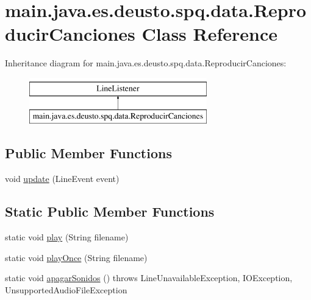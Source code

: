 \hypertarget{classmain_1_1java_1_1es_1_1deusto_1_1spq_1_1data_1_1_reproducir_canciones}{}\section{main.\+java.\+es.\+deusto.\+spq.\+data.\+Reproducir\+Canciones Class Reference}
\label{classmain_1_1java_1_1es_1_1deusto_1_1spq_1_1data_1_1_reproducir_canciones}
Inheritance diagram for main.\+java.\+es.\+deusto.\+spq.\+data.\+Reproducir\+Canciones\+:\begin{figure}[H]
\begin{center}
\leavevmode
\includegraphics[height=2.000000cm]{classmain_1_1java_1_1es_1_1deusto_1_1spq_1_1data_1_1_reproducir_canciones}
\end{center}
\end{figure}
\subsection*{Public Member Functions}
\begin{DoxyCompactItemize}
\item 
void \hyperlink{classmain_1_1java_1_1es_1_1deusto_1_1spq_1_1data_1_1_reproducir_canciones_a46c7246e92c3dc722ae252edc8d1ec7d}{update} (Line\+Event event)
\end{DoxyCompactItemize}
\subsection*{Static Public Member Functions}
\begin{DoxyCompactItemize}
\item 
static void \hyperlink{classmain_1_1java_1_1es_1_1deusto_1_1spq_1_1data_1_1_reproducir_canciones_a5270ef0f2e3307718ecb188b124b6e76}{play} (String filename)
\item 
static void \hyperlink{classmain_1_1java_1_1es_1_1deusto_1_1spq_1_1data_1_1_reproducir_canciones_aab5c175533d7e5292d6a884941bbc07b}{play\+Once} (String filename)
\item 
static void \hyperlink{classmain_1_1java_1_1es_1_1deusto_1_1spq_1_1data_1_1_reproducir_canciones_a45d852d99dac03c6831de7df135a08f9}{apagar\+Sonidos} ()  throws Line\+Unavailable\+Exception, I\+O\+Exception, Unsupported\+Audio\+File\+Exception 
\end{DoxyCompactItemize}


